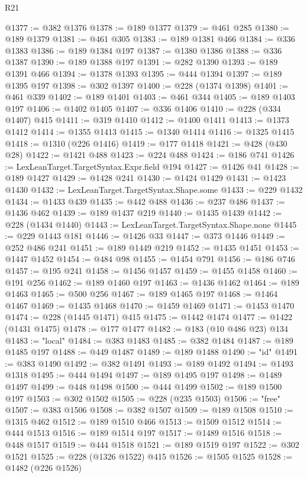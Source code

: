 \begin{lexlean}{R21}
\begin{coremodule}
@1377 := @382 @1376
@1378 := @189 @1377
@1379 := @461 @285
@1380 := @189 @1379
@1381 := @461 @305
@1383 := @189 @1381 @466
@1384 := @336 @1383
@1386 := @189 @1384 @197
@1387 := @1380 @1386
@1388 := @336 @1387
@1390 := @189 @1388 @197
@1391 := @282 @1390
@1393 := @189 @1391 @466
@1394 := @1378 @1393
@1395 := @444 @1394
@1397 := @189 @1395 @197
@1398 := @302 @1397
@1400 := @228 (@1374 @1398)
@1401 := @461 @339
@1402 := @189 @1401
@1403 := @461 @344
@1405 := @189 @1403 @197
@1406 := @1402 @1405
@1407 := @336 @1406
@1410 := @228 (@334 @1407) @415
@1411 := @319 @1410
@1412 := @1400 @1411
@1413 := @1373 @1412
@1414 := @1355 @1413
@1415 := @1340 @1414
@1416 := @1325 @1415
@1418 := @1310 (@226 @1416)
@1419 := @177 @1418
@1421 := @428 (@430 @28)
@1422 := @1421 @488
@1423 := @224 @488
@1424 := @186 @741
@1426 := LexLeanTarget.TargetSyntax.Expr.field @194
@1427 := @1426 @41
@1428 := @189 @1427
@1429 := @1428 @241
@1430 := @1424 @1429
@1431 := @1423 @1430
@1432 := LexLeanTarget.TargetSyntax.Shape.some
@1433 := @229 @1432
@1434 := @1433 @439
@1435 := @442 @488
@1436 := @237 @486
@1437 := @1436 @462
@1439 := @189 @1437 @219
@1440 := @1435 @1439
@1442 := @228 (@1434 @1440)
@1443 := LexLeanTarget.TargetSyntax.Shape.none
@1445 := @229 @1443 @181
@1446 := @1426 @33
@1447 := @373 @1446
@1449 := @252 @486 @241
@1451 := @189 @1449 @219
@1452 := @1435 @1451
@1453 := @1447 @1452
@1454 := @484 @98
@1455 := @1454 @791
@1456 := @186 @746
@1457 := @195 @241
@1458 := @1456 @1457
@1459 := @1455 @1458
@1460 := @191 @256
@1462 := @189 @1460 @197
@1463 := @1436 @1462
@1464 := @189 @1463
@1465 := @500 @256
@1467 := @189 @1465 @197
@1468 := @1464 @1467
@1469 := @1435 @1468
@1470 := @1459 @1469
@1471 := @1453 @1470
@1474 := @228 (@1445 @1471) @415
@1475 := @1442 @1474
@1477 := @1422 (@1431 @1475)
@1478 := @177 @1477
@1482 := @183 (@10 @486 @23) @134
@1483 := "local"
@1484 := @383 @1483
@1485 := @382 @1484
@1487 := @189 @1485 @197
@1488 := @449 @1487
@1489 := @189 @1488
@1490 := "id"
@1491 := @383 @1490
@1492 := @382 @1491
@1493 := @189 @1492
@1494 := @1493 @1318
@1495 := @444 @1494
@1497 := @189 @1495 @197
@1498 := @1489 @1497
@1499 := @448 @1498
@1500 := @444 @1499
@1502 := @189 @1500 @197
@1503 := @302 @1502
@1505 := @228 (@235 @1503)
@1506 := "free"
@1507 := @383 @1506
@1508 := @382 @1507
@1509 := @189 @1508
@1510 := @1315 @462
@1512 := @189 @1510 @466
@1513 := @1509 @1512
@1514 := @444 @1513
@1516 := @189 @1514 @197
@1517 := @1489 @1516
@1518 := @448 @1517
@1519 := @444 @1518
@1521 := @189 @1519 @197
@1522 := @302 @1521
@1525 := @228 (@1326 @1522) @415
@1526 := @1505 @1525
@1528 := @1482 (@226 @1526)

\end{coremodule}
\end{lexlean}
